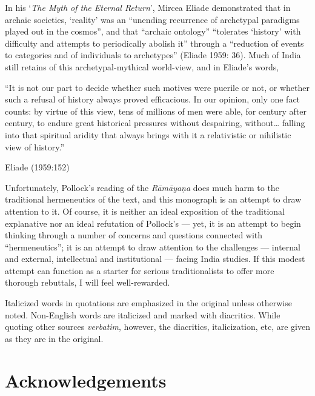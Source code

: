 In his ‘{\sl The Myth of the Eternal Return}’, Mircea Eliade demonstrated that in archaic societies, ‘reality’ was an “unending recurrence of archetypal paradigms played out in the cosmos”, and that “archaic ontology” “tolerates ‘history’ with difficulty and attempts to periodically abolish it” through a “reduction of events to categories and of individuals to archetypes” (Eliade 1959: 36). Much of India still retains of this archetypal-mythical world-view, and in Eliade’s words,  

\begin{myquote}
“It is not our part to decide whether such motives were puerile or not, or whether such a refusal of history always proved efficacious. In our opinion, only one fact counts: by virtue of this view, tens of millions of men were able, for century after century, to endure great historical pressures without despairing, without… falling into that spiritual aridity that always brings with it a relativistic or nihilistic view of history.”

\hfill Eliade (1959:152)
\end{myquote}

Unfortunately, Pollock’s reading of the {\sl Rāmāyaṇa} does much harm to the traditional hermeneutics of the text, and this monograph is an attempt to draw attention to it. Of course, it is neither an ideal exposition of the traditional explanative nor an ideal refutation of Pollock’s --- yet, it is an attempt to begin thinking through a number of concerns and questions connected with “hermeneutics”; it is an attempt to draw attention to the challenges --- internal and external, intellectual and institutional --- facing India studies. If this modest attempt can function as a starter for serious traditionalists to offer more thorough rebuttals, I will feel well-rewarded. 

Italicized words in quotations are emphasized in the original unless otherwise noted. Non-English words are italicized and marked with diacritics. While quoting other sources {\sl verbatim}, however, the diacritics, italicization, etc, are given as they are in the original. 


\section*{Acknowledgements}\label{ack1}


